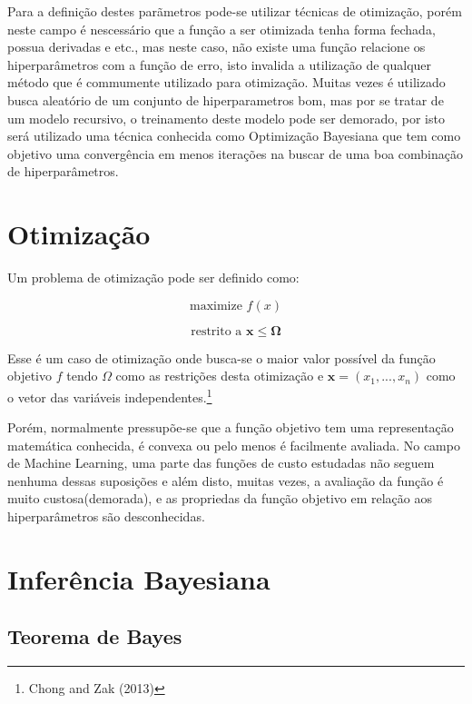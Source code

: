 \documentclass[
	12pt,				%
	a4paper,		%
	oneside,    %
	chapter=TITLE,		   %
	section=TITLE,		   %
	subsection=TITLE,	   %
	subsubsection=TITLE, %
	english,			%
	french,				%
	spanish,			%
	brazil,				%
]{abntex2}
\begin{document}
Para a definição destes parãmetros pode-se utilizar técnicas de
otimização, porém neste campo é nescessário que a função a ser otimizada
tenha forma fechada, possua derivadas e etc., mas neste caso, não existe
uma função relacione os hiperparâmetros com a função de erro, isto
invalida a utilização de qualquer método que é commumente utilizado para
otimização. Muitas vezes é utilizado busca aleatório de um conjunto de
hiperparametros bom, mas por se tratar de um modelo recursivo, o
treinamento deste modelo pode ser demorado, por isto será utilizado uma
técnica conhecida como Optimização Bayesiana que tem como objetivo uma
convergência em menos iterações na buscar de uma boa combinação de
hiperparâmetros.

\hypertarget{otimizauxe7uxe3o}{%
\section{Otimização}\label{otimizauxe7uxe3o}}

Um problema de otimização pode ser definido como:

\[
\mbox{maximize } f(x)
\]

\[
\mbox{restrito a } \boldsymbol{x} \leq \boldsymbol{\Omega}
\]

Esse é um caso de otimização onde busca-se o maior valor possível da
função objetivo \(f\) tendo \(\Omega\) como as restrições desta
otimização e \(\boldsymbol{x} = (x_1,...,x_n)\) como o vetor das
variáveis independentes.\footnote{Chong and Zak (2013)}

Porém, normalmente pressupõe-se que a função objetivo tem uma
representação matemática conhecida, é convexa ou pelo menos é facilmente
avaliada. No campo de Machine Learning, uma parte das funções de custo
estudadas não seguem nenhuma dessas suposições e além disto, muitas
vezes, a avaliação da função é muito custosa(demorada), e as propriedas
da função objetivo em relação aos hiperparâmetros são desconhecidas.

\hypertarget{inferuxeancia-bayesiana}{%
\section{Inferência Bayesiana}\label{inferuxeancia-bayesiana}}

\hypertarget{teorema-de-bayes}{%
\subsection{Teorema de Bayes}\label{teorema-de-bayes}}
\end{document}
